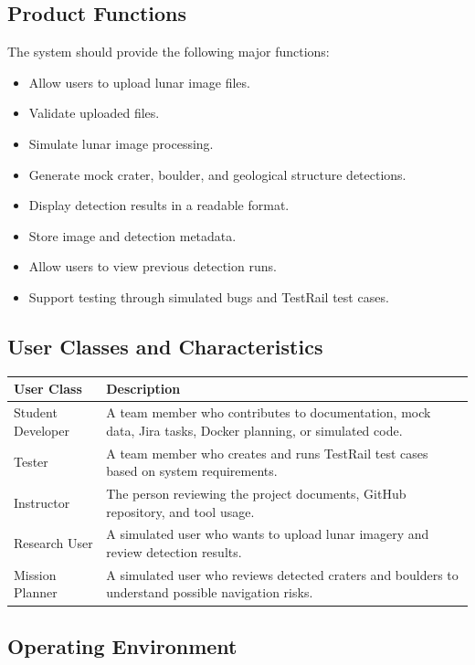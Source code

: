 \documentclass[12pt]{article}
\begin{document}
\subsection{Product Functions}

The system should provide the following major functions:

\begin{itemize}
    \item Allow users to upload lunar image files.
    \item Validate uploaded files.
    \item Simulate lunar image processing.
    \item Generate mock crater, boulder, and geological structure detections.
    \item Display detection results in a readable format.
    \item Store image and detection metadata.
    \item Allow users to view previous detection runs.
    \item Support testing through simulated bugs and TestRail test cases.
\end{itemize}

\subsection{User Classes and Characteristics}

\begin{longtable}{|p{1.7in}|p{4.3in}|}
\hline
\textbf{User Class} & \textbf{Description} \\
\hline
Student Developer & A team member who contributes to documentation, mock data, Jira tasks, Docker planning, or simulated code. \\
\hline
Tester & A team member who creates and runs TestRail test cases based on system requirements. \\
\hline
Instructor & The person reviewing the project documents, GitHub repository, and tool usage. \\
\hline
Research User & A simulated user who wants to upload lunar imagery and review detection results. \\
\hline
Mission Planner & A simulated user who reviews detected craters and boulders to understand possible navigation risks. \\
\hline
\end{longtable}

\subsection{Operating Environment}
\end{document}
